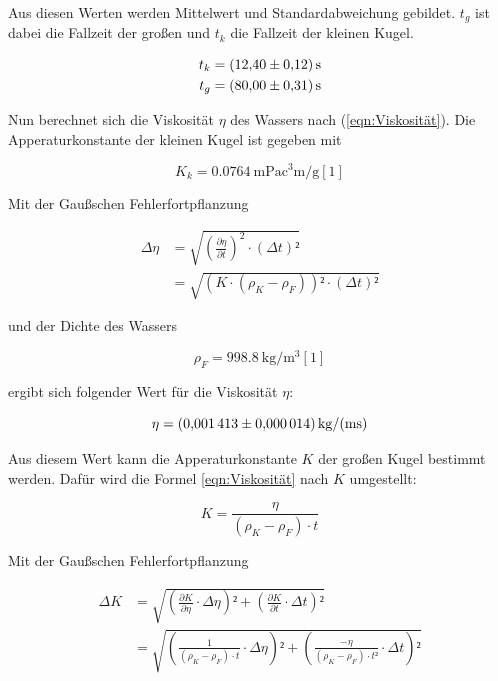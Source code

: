 Aus diesen Werten werden Mittelwert und Standardabweichung gebildet.
$t_g$ ist dabei die Fallzeit der großen und $t_k$ die Fallzeit der kleinen
Kugel.

\begin{align*}
t_k &= \SI{12.40+-0.12}{\second}\\
t_g &= \SI{80.00+-0.31}{\second}
\end{align*}

Nun berechnet sich die Viskosität $\eta$ des Wassers nach (\ref{eqn:Viskosität}).
Die Apperaturkonstante der kleinen Kugel ist gegeben mit 

\begin{equation*}
K_k = \SI{0.0764}{\milli\pascal\cubic\centi\meter\per\gram} [1]
\end{equation*}

Mit der Gaußschen Fehlerfortpflanzung

\begin{align}
\Delta \eta &= \sqrt{\left(\frac{\partial\eta}{\partial t}\right)^2 \cdot \left(\Delta t\right)²}\\
&=\sqrt{\left(K\cdot(\rho_K - \rho_F)\right)²\cdot(\Delta t)²}
\end{align}

und der Dichte des Wassers 

\begin{equation}
\rho _F = \SI{998.8}{\kilo\gram\per\cubic\meter} [1]
\end{equation}

ergibt sich folgender Wert für die Viskosität $\eta$:

\begin{equation*}
\eta = \SI{0.001413+-0.000014}{\kilo\gram\per(\meter\second)}
\end{equation*}

Aus diesem Wert kann die Apperaturkonstante $K$ der großen Kugel
bestimmt werden. Dafür wird die Formel \ref{eqn:Viskosität} nach 
$K$ umgestellt: 

\begin{equation*}
K = \frac{\eta}{(\rho_K - \rho_F) \cdot t}
\end{equation*}

Mit der Gaußschen Fehlerfortpflanzung

\begin{align*}
\Delta K &= \sqrt{\left(\frac{\partial K}{\partial \eta}\cdot \Delta\eta\right)² + \left(\frac{\partial K}{\partial t}\cdot \Delta t\right)²}\\
&= \sqrt{\left(\frac{1}{(\rho_K - \rho_F)\cdot t}\cdot \Delta\eta\right)² + \left(\frac{-\eta}{(\rho_K - \rho_F)\cdot t²}\cdot \Delta t\right)²}
\end{align*}

